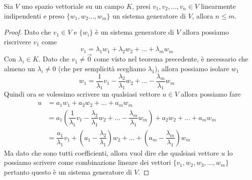 \documentclass{rapport}
\begin{document}
\begin{teorema}{}{}
  Sia $V$ uno spazio vettoriale su un campo $K$, presi $v_1, v_2, ..., v_n\in V$ linearmente indipendenti e preso $\{w_1, w_2 ..., w_m\}$ un sistema generatore di $V$, allora $n\leq m$. 
\end{teorema}
\begin{proof}
  Dato che $v_1\in V$ e $\{w_i\}$ è un sistema generatore di $V$ allora possiamo riscrivere $v_1$ come 
  \[
  v_1 = \lambda_1 w_1 + \lambda_2 w_2 + ... + \lambda_m w_m 
  \] 
  Con $\lambda_i\in K$. Dato che $v_1 \ne \vec{0}$ come visto nel teorema precedente, è necessario che almeno un $\lambda_i \ne 0$ (che per semplicità scegliamo $\lambda_1$), allora possiamo isolare $w_1$
  \[
  w_1 =\dfrac{1}{\lambda_1} v_1 - \dfrac{\lambda_2}{\lambda_1}w_2 + ... - \dfrac{\lambda_m}{\lambda_1}w_m 
  \]
  Quindi ora se volessimo scrivere un qualsiasi vettore $u \in V$ allora possiamo fare 
  \begin{align*}
  u &= a_1w_1 + a_2w_2 + ... + a_mw_m \\
  &= a_1\left(\dfrac{1}{\lambda_1} v_1 - \dfrac{\lambda_2}{\lambda_1}w_2 + ... - \dfrac{\lambda_m}{\lambda_1}w_m \right) + a_2w_2 + ... + a_mw_m  \\
  &= \dfrac{a_1}{\lambda_1} v_1 + \left(a_1-\dfrac{\lambda_2}{\lambda_1}\right)w_2 + ... +\left(a_m-\dfrac{\lambda_m}{\lambda_1}\right)w_m 
  \end{align*}
  Ma dato che sono tutti coefficienti, allora vuol dire che qualsiasi vettore $u$ lo possiamo scrivere come combinazione lineare dei vettori $\{v_1, w_2, w_3, ..., w_m\}$ pertanto questo è un sistema generatore di $V$. 


\end{proof}
\end{document}
